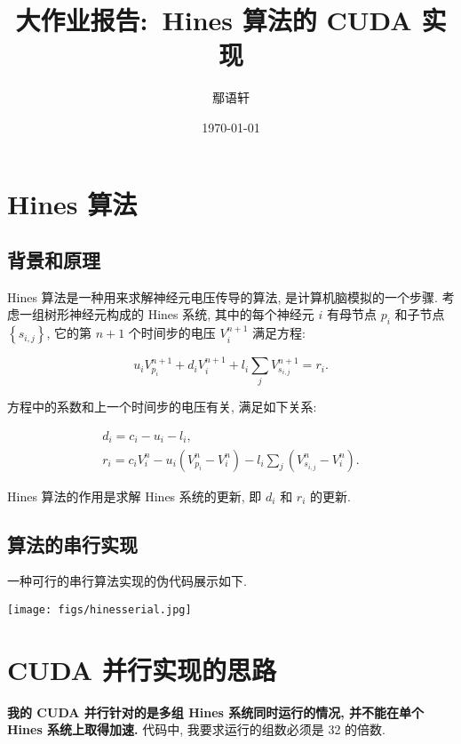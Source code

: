 \documentclass[12pt]{article}
\title{大作业报告:~Hines 算法的 CUDA 实现}
\author{鄢语轩}
\date{\today}
\begin{document}
\maketitle

\section{Hines 算法}

\subsection{背景和原理}

Hines 算法是一种用来求解神经元电压传导的算法, 是计算机脑模拟的一个步骤. 考虑一组树形神经元构成的 Hines 系统, 其中的每个神经元 $i$ 有母节点 $p_i$ 和子节点 $\left\{s_{i,j}\right\}$,  它的第 $n+1$ 个时间步的电压 $V_{i}^{n+1}$ 满足方程:

\begin{equation}
    u_i V_{p_i}^{n+1} + d_i V_i^{n+1} + l_i \sum_{j} V_{s_{i,j}}^{n+1} = r_i.
\end{equation}

方程中的系数和上一个时间步的电压有关, 满足如下关系:

\begin{equation}
    \begin{aligned}
        d_i = c_i - u_i - l_i,\\
        r_i = c_i V_i^n - u_i (V_{p_i}^{n} - V_{i}^{n}) - l_i \sum_{j} (V_{s_{i,j}}^{n} - V_{i}^{n}).
    \end{aligned}
\end{equation}

Hines 算法的作用是求解 Hines 系统的更新, 即 $d_i$ 和 $r_i$ 的更新.

\subsection{算法的串行实现}

一种可行的串行算法实现的伪代码展示如下. \cite{cuHinesBatch}

\texttt{[image: figs/hinesserial.jpg]}

\section{CUDA 并行实现的思路}

\textbf{我的 CUDA 并行针对的是多组 Hines 系统同时运行的情况, 并不能在单个 Hines 系统上取得加速.} 代码中, 我要求运行的组数必须是 32 的倍数.
\end{document}
